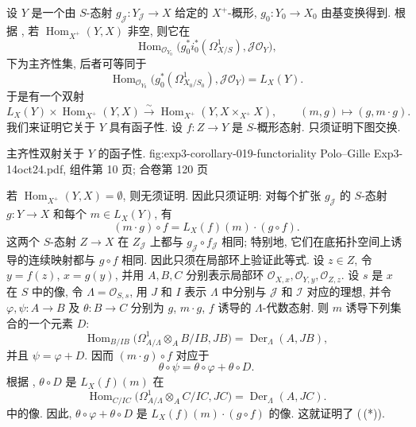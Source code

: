 设 \(Y\) 是一个由 \(S\)-态射 \(g_{\mathscr J}:Y_{\mathscr J}\to X\)
给定的 \(X^+\)-概形, \(g_0:Y_0\to X_0\) 由基变换得到.
根据 , 若
\(\operatorname{Hom}_{X^+}(Y,X)\) 非空, 则它在
\[
 \operatorname{Hom}_{\mathscr O_{Y_0}}
 \bigl(g_0^*i_0^*(\Omega^1_{X/S}),\mathscr J\mathscr O_Y\bigr),
\]
下为主齐性集, 后者可等同于
\[
 \operatorname{Hom}_{\mathscr O_{Y_0}}
 \bigl(g_0^*(\Omega^1_{X_0/S_0}),\mathscr J\mathscr O_Y\bigr)
 =L_X(Y).
\]
于是有一个双射
\[
 L_X(Y)\times\operatorname{Hom}_{X^+}(Y,X)
 \xrightarrow{\sim}
 \operatorname{Hom}_{X^+}(Y,X\times_{X^+}X),
 \qquad
 (m,g)\longmapsto(g,m\cdot g).
\]
我们来证明它关于 \(Y\) 具有函子性. 设 \(f:Z\to Y\) 是 \(S\)-概形态射.
只须证明下图交换.

  {主齐性双射关于 \(Y\) 的函子性.}
  {fig:exp3-corollary-019-functoriality}
  {Polo--Gille Exp3-14oct24.pdf, 组件第 10 页; 合卷第 120 页}

若 \(\operatorname{Hom}_{X^+}(Y,X)=\emptyset\), 则无须证明.
因此只须证明: 对每个扩张 \(g_{\mathscr J}\) 的 \(S\)-态射
\(g:Y\to X\) 和每个 \(m\in L_X(Y)\), 有
\begin{equation}
 (m\cdot g)\circ f=L_X(f)(m)\cdot(g\circ f).
 \tag{0.1.9\,(*)}\label{sga3:iii:corollary:0-1-9:equation:0-1-9-star}
\end{equation}
这两个 \(S\)-态射 \(Z\to X\) 在 \(Z_{\mathscr J}\) 上都与
\(g_{\mathscr J}\circ f_{\mathscr J}\) 相同; 特别地,
它们在底拓扑空间上诱导的连续映射都与 \(g\circ f\) 相同.
因此只须在局部环上验证此等式. 设 \(z\in Z\), 令 \(y=f(z)\),
\(x=g(y)\), 并用 \(A,B,C\) 分别表示局部环
\(\mathscr O_{X,x},\mathscr O_{Y,y},\mathscr O_{Z,z}\).
设 \(s\) 是 \(x\) 在 \(S\) 中的像, 令
\(\Lambda=\mathscr O_{S,s}\), 用 \(J\) 和 \(I\) 表示
\(\Lambda\) 中分别与 \(\mathscr J\) 和 \(\mathscr I\) 对应的理想,
并令 \(\varphi,\psi:A\to B\) 及 \(\theta:B\to C\)
分别为 \(g\), \(m\cdot g\), \(f\) 诱导的 \(\Lambda\)-代数态射.
则 \(m\) 诱导下列集合的一个元素 \(D\):
\[
 \operatorname{Hom}_{B/IB}
 \bigl(\Omega^1_{A/\Lambda}\otimes_AB/IB,JB\bigr)
 =\operatorname{Der}_{\Lambda}(A,JB),
\]
并且 \(\psi=\varphi+D\). 因而 \((m\cdot g)\circ f\) 对应于
\[
 \theta\circ\psi=\theta\circ\varphi+\theta\circ D.
\]
根据 , \(\theta\circ D\)
是 \(L_X(f)(m)\) 在
\[
 \operatorname{Hom}_{C/IC}
 \bigl(\Omega^1_{A/\Lambda}\otimes_AC/IC,JC\bigr)
 =\operatorname{Der}_{\Lambda}(A,JC).
\]
中的像. 因此, \(\theta\circ\varphi+\theta\circ D\) 是
\(L_X(f)(m)\cdot(g\circ f)\) 的像.
这就证明了 (\,(*)).

